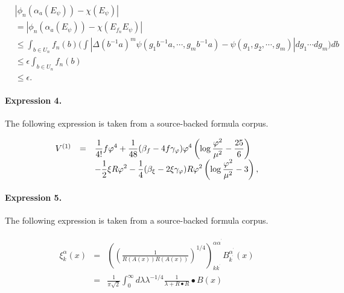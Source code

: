 \documentclass[11pt]{article}
\begin{document}
\begin{align*}& |\phi_{n}(\alpha_{a}(E_{\psi}))-\chi(E_{\psi})| \\&= | \phi_{n}(\alpha_{a}(E_{\psi}))-\chi(E_{f_{n}}E_{\psi})|\\& \leq \int_{b \in U_{n}}f_{n}(b)\Big(\int |\Delta(b^{-1}a)^{m}\psi(g_{1}b^{-1}a,\cdots,g_{m}b^{-1}a)-\psi(g_{1},g_{2},\cdots,g_{m})| dg_{1} \cdots dg_{m} \Big)db \\ & \leq \epsilon \int _{b \in U_{n}}f_{n}(b) \\& \leq \epsilon.\end{align*}

\paragraph{Expression 4.} The following expression is taken from a source-backed formula corpus.

\begin{align*}\begin{array}{lll}V^{(1)}&=&\displaystyle{1 \over 4!} f\varphi^4+{1 \over 48} (\beta_f -4f \gamma_{\varphi}) \varphi^4\left( \log {\varphi^2 \over \mu^2 } - {25 \over 6} \right) \\&&\displaystyle-{1 \over 2}\xi R \varphi^2-{1 \over 4} (\beta_{\xi} -2\xi \gamma_{\varphi}) R \varphi^2\left( \log {\varphi^2 \over \mu^2 } -3 \right),\end{array}\end{align*}

\paragraph{Expression 5.} The following expression is taken from a source-backed formula corpus.

\begin{align*}\begin{array}{ccl}\xi _k^\alpha (x) & = & \left( \left( \frac 1{R\left( A(x)\right) R\left(A(x)\right) }\right) ^{1/4}\right) _{kk^{^{\prime }}}^{\alpha \alpha^{^{\prime }}}B_{k^{^{\prime }}}^{\alpha ^{^{\prime }}}(x) \\ & = & \frac 1{\pi \sqrt{2}}\int_0^\infty d\lambda \lambda ^{-1/4}\frac1{\lambda +R\bullet R}\bullet B(x) \end{array}\end{align*}
\end{document}
